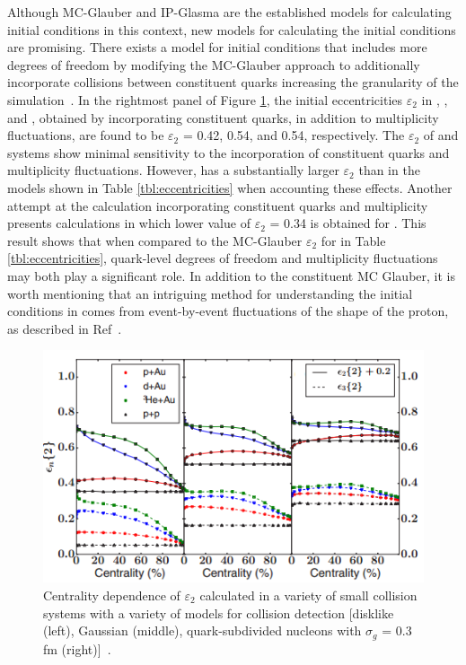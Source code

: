 Although MC-Glauber and IP-Glasma are the established models for calculating initial conditions in this context, new models for calculating the initial conditions are promising. There exists a model for initial conditions that includes more degrees of freedom by modifying the MC-Glauber approach to additionally incorporate collisions between constituent quarks increasing the granularity of the simulation~\cite{PhysRevC.67.064905}. In the rightmost panel of Figure \ref{fig:epsilon_2_theory}, the initial eccentricities $\varepsilon_2$ in \pau, \dau, and \hau, obtained by incorporating constituent quarks, in addition to multiplicity fluctuations, are found to be $\varepsilon_2$ = 0.42, 0.54, and 0.54, respectively. The $\varepsilon_2$ of \dau and \hau systems show minimal sensitivity to the incorporation of constituent quarks and multiplicity fluctuations. However, \pau has a substantially larger $\varepsilon_2$ than in the models shown in Table \ref{tbl:eccentricities} when accounting these effects. Another attempt at the calculation incorporating constituent quarks and multiplicity presents calculations in which lower value of $\varepsilon_2$ = 0.34 is obtained for \pau  \cite{PhysRevC.94.024919}. This result shows that when compared to the MC-Glauber $\varepsilon_2$ for \pau in Table \ref{tbl:eccentricities}, quark-level degrees of freedom and multiplicity fluctuations may both play a significant role. In addition to the constituent MC Glauber, it is worth mentioning that an intriguing method for understanding the initial conditions in \pau comes from event-by-event fluctuations of the shape of the proton, as described in Ref~\cite{Schlichting2014313}. 

\begin{figure}[!ht]
\begin{center}
\includegraphics[width=0.65\linewidth]{figs/theoretical_epsilon_values.png}
\caption{Centrality dependence of $\varepsilon_2$ calculated in a variety of small collision systems with a variety of models for collision detection [disklike (left), Gaussian (middle), quark-subdivided nucleons with $\sigma_g$ = 0.3 fm (right)]~\cite{PhysRevC.94.024919}.}
\label{fig:epsilon_2_theory}
\end{center}
\end{figure}

